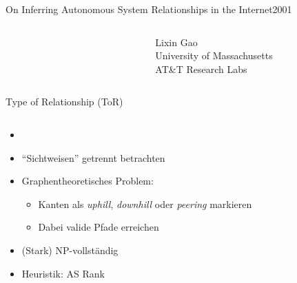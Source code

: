 \documentclass[ngerman,compress,hyperref={bookmarks}]{beamer}
\begin{document}
\begin{frame}{On Inferring Autonomous System Relationships in the Internet}{2001}
\begin{columns}[c]
\begin{column}{0.1\textwidth}
\begin{figure}
   \label{gao}
  \end{figure}
 \end{column}
 \begin{column}{0.3\textwidth}
  {\scriptsize Lixin Gao\\
  \vspace{0.1cm}
  University of Massachusetts\\
  AT\&T Research Labs}
 \end{column}
\end{columns}
\end{frame}

\begin{frame}{Type of Relationship (ToR)}
 \begin{columns}[c]
  \begin{column}{0.5\textwidth}
   \begin{itemize}
    \item \cite{Subramanian:2001:CIH:894120, Di_Battista:2007:CTR:1279660.1279662}
    \item ``Sichtweisen'' getrennt betrachten
    \item Graphentheoretisches Problem:
    \begin{itemize}
     \item Kanten als \emph{uphill}, \emph{downhill} oder \emph{peering} markieren
     \item Dabei valide Pfade erreichen
    \end{itemize}
    \item (Stark) NP-vollständig
    \item Heuristik: AS Rank
   \end{itemize}

  \end{column}
  \begin{column}{0.1\textwidth}

  \end{column}
  \begin{column}{0.3\textwidth}

  \end{column}
 \end{columns}

\end{frame}
\end{document}
